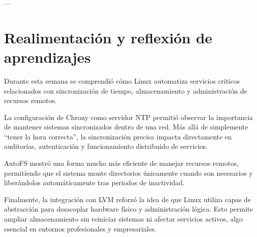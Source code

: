 \documentclass[11pt, letterpaper]{article}
\begin{document}
---
\section{Realimentación y reflexión de aprendizajes}
\label{sec:org8881613}

Durante esta semana se comprendió cómo Linux automatiza servicios críticos relacionados con sincronización de tiempo, almacenamiento y administración de recursos remotos.

La configuración de Chrony como servidor NTP permitió observar la importancia de mantener sistemas sincronizados dentro de una red. Más allá de simplemente “tener la hora correcta”, la sincronización precisa impacta directamente en auditorías, autenticación y funcionamiento distribuido de servicios.

AutoFS mostró una forma mucho más eficiente de manejar recursos remotos, permitiendo que el sistema monte directorios únicamente cuando son necesarios y liberándolos automáticamente tras periodos de inactividad.

Finalmente, la integración con LVM reforzó la idea de que Linux utiliza capas de abstracción para desacoplar hardware físico y administración lógica. Esto permite ampliar almacenamiento sin reiniciar sistemas ni afectar servicios activos, algo esencial en entornos profesionales y empresariales.
\end{document}
